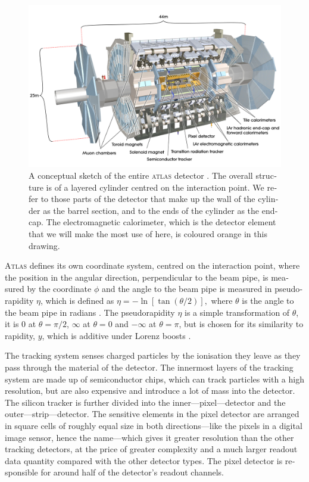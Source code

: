 \begin{english}
\begin{figure}[htp]
\begin{minipage}[b]{.69\textwidth}
\includegraphics[width=1\textwidth]{AllAtlasBig}
\end{minipage}
\begin{minipage}[b]{.3\textwidth}
\caption{A conceptual sketch of the entire \textsc{atlas} detector \cite{atlasweb}. The overall structure is of a layered cylinder centred on the interaction point. We refer to those parts of the detector that make up the wall of the cylinder as the barrel section, and to the ends of the cylinder as the endcap. The electromagnetic calorimeter, which is the detector element that we will make the most use of here, is coloured orange in this drawing.}
\end{minipage}
\label{allatlas}
\end{figure}

\textsc{Atlas} defines its own coordinate system, centred on the interaction point, where the position in the angular direction, perpendicular to the beam pipe, is measured by the coordinate $\phi$ and the angle to the beam pipe is measured in pseudorapidity $\eta$, which is defined as
\(\eta=-\ln[\tan(\theta/2)],\)
where $\theta$ is the angle to the beam pipe in radians \cite{green:eta}. The pseudorapidity $\eta$ is a simple transformation of $\theta$, it is 0 at $\theta=\pi/2$, $\infty$ at $\theta=0$ and $-\infty$ at $\theta=\pi$, but is chosen for its similarity to rapidity, $y$, which is additive under Lorenz boosts \cite{green:y}.

The tracking system senses charged particles by the ionisation they leave as they pass through the material of the detector. The innermost layers of the tracking system are made up of semiconductor chips, which can track particles with a high resolution, but are also expensive and introduce a lot of mass into the detector. The silicon tracker is further divided into the inner---pixel---detector and the outer---strip---detector. The sensitive elements in the pixel detector are arranged in square cells of roughly equal size in both directions---like the pixels in a digital image sensor, hence the name---which gives it greater resolution than the other tracking detectors, at the price of greater complexity and a much larger readout data quantity compared with the other detector types. The pixel detector is responsible for around half of the detector's readout channels.


\end{english}
